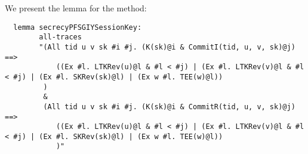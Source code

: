 We present the lemma for the \mSigStat{} method:
\begin{lstlisting}
  lemma secrecyPFSGIYSessionKey:
        all-traces
        "(All tid u v sk #i #j. (K(sk)@i & CommitI(tid, u, v, sk)@j) ==>
            ((Ex #l. LTKRev(u)@l & #l < #j) | (Ex #l. LTKRev(v)@l & #l < #j) | (Ex #l. SKRev(sk)@l) | (Ex w #l. TEE(w)@l))
         )
         &
         (All tid u v sk #i #j. (K(sk)@i & CommitR(tid, u, v, sk)@j) ==>
            ((Ex #l. LTKRev(u)@l & #l < #j) | (Ex #l. LTKRev(v)@l & #l < #j) | (Ex #l. SKRev(sk)@l) | (Ex w #l. TEE(w)@l))
            )"
\end{lstlisting}

